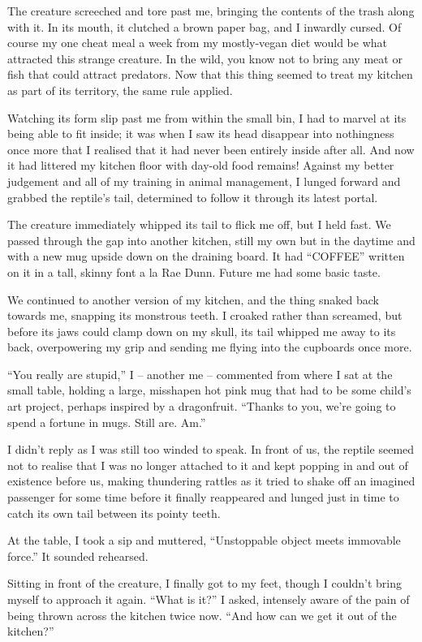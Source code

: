 The creature screeched and tore past me, bringing the contents of the trash along with it. In its mouth, it clutched a brown paper bag, and I inwardly cursed. Of course my one cheat meal a week from my mostly-vegan diet would be what attracted this strange creature. In the wild, you know not to bring any meat or fish that could attract predators. Now that this thing seemed to treat my kitchen as part of its territory, the same rule applied.

Watching its form slip past me from within the small bin, I had to marvel at its being able to fit inside; it was when I saw its head disappear into nothingness once more that I realised that it had never been entirely inside after all. And now it had littered my kitchen floor with day-old food remains! Against my better judgement and all of my training in animal management, I lunged forward and grabbed the reptile's tail, determined to follow it through its latest portal.

The creature immediately whipped its tail to flick me off, but I held fast. We passed through the gap into another kitchen, still my own but in the daytime and with a new mug upside down on the draining board. It had ``COFFEE'' written on it in a tall, skinny font a la Rae Dunn. Future me had some basic taste.

We continued to another version of my kitchen, and the thing snaked back towards me, snapping its monstrous teeth. I croaked rather than screamed, but before its jaws could clamp down on my skull, its tail whipped me away to its back, overpowering my grip and sending me flying into the cupboards once more.

``You really are stupid,'' I – another me – commented from where I sat at the small table, holding a large, misshapen hot pink mug that had to be some child's art project, perhaps inspired by a dragonfruit. ``Thanks to you, we're going to spend a fortune in mugs. Still are. Am.''

I didn't reply as I was still too winded to speak. In front of us, the reptile seemed not to realise that I was no longer attached to it and kept popping in and out of existence before us, making thundering rattles as it tried to shake off an imagined passenger for some time before it finally reappeared and lunged just in time to catch its own tail between its pointy teeth.

At the table, I took a sip and muttered, ``Unstoppable object meets immovable force.'' It sounded rehearsed.

Sitting in front of the creature, I finally got to my feet, though I couldn't bring myself to approach it again. ``What is it?'' I asked, intensely aware of the pain of being thrown across the kitchen twice now. ``And how can we get it out of the kitchen?''

